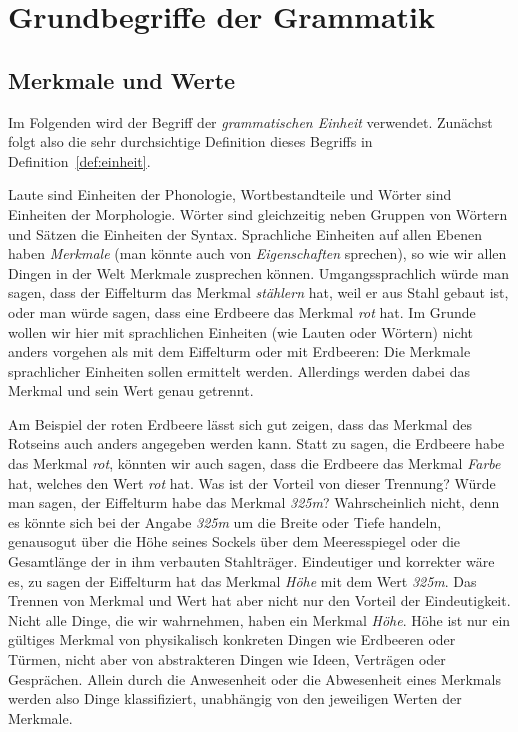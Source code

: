 \chapter{Grundbegriffe der Grammatik}
\label{sec:grundbegriffedergrammatik}

\section{Merkmale und Werte}
\label{sec:merkmaleundwerte}

Im Folgenden wird der Begriff der \textit{grammatischen Einheit} verwendet.
Zunächst folgt also die sehr durchsichtige Definition dieses Begriffs in Definition~\ref{def:einheit}.



Laute sind Einheiten der Phonologie, Wortbestandteile und Wörter sind Einheiten der Morphologie.
Wörter sind gleichzeitig neben Gruppen von Wörtern und Sätzen die Einheiten der Syntax.
Sprachliche Einheiten auf allen Ebenen haben \textit{Merkmale} (man könnte auch von \textit{Eigenschaften} sprechen), so wie wir allen Dingen in der Welt Merkmale zusprechen können.
Umgangssprachlich würde man sagen, dass der Eiffelturm das Merkmal \textit{stählern} hat, weil er aus Stahl gebaut ist, oder man würde sagen, dass eine Erdbeere das Merkmal \textit{rot} hat.
Im Grunde wollen wir hier mit sprachlichen Einheiten (wie Lauten oder Wörtern) nicht anders vorgehen als mit dem Eiffelturm oder mit Erdbeeren:
Die Merkmale sprachlicher Einheiten sollen ermittelt werden.
Allerdings werden dabei das Merkmal und sein Wert genau getrennt.


Am Beispiel der roten Erdbeere lässt sich gut zeigen, dass das Merkmal des Rotseins auch anders angegeben werden kann.
Statt zu sagen, die Erdbeere habe das Merkmal \textit{rot}, könnten wir auch sagen, dass die Erdbeere das Merkmal \textit{Farbe} hat, welches den Wert \textit{rot} hat.
Was ist der Vorteil von dieser Trennung?
Würde man sagen, der Eiffelturm habe das Merkmal \textit{325m}?
Wahrscheinlich nicht, denn es könnte sich bei der Angabe \textit{325m} um die Breite oder Tiefe handeln, genausogut über die Höhe seines Sockels über dem Meeresspiegel oder die Gesamtlänge der in ihm verbauten Stahlträger.
Eindeutiger und korrekter wäre es, zu sagen der Eiffelturm hat das Merkmal \textit{Höhe} mit dem Wert \textit{325m}.
Das Trennen von Merkmal und Wert hat aber nicht nur den Vorteil der Eindeutigkeit.
Nicht alle Dinge, die wir wahrnehmen, haben ein Merkmal \textit{Höhe}.
Höhe ist nur ein gültiges Merkmal von physikalisch konkreten Dingen wie Erdbeeren oder Türmen, nicht aber von abstrakteren Dingen wie Ideen, Verträgen oder Gesprächen.
Allein durch die Anwesenheit oder die Abwesenheit eines Merkmals werden also Dinge klassifiziert, unabhängig von den jeweiligen Werten der Merkmale.

